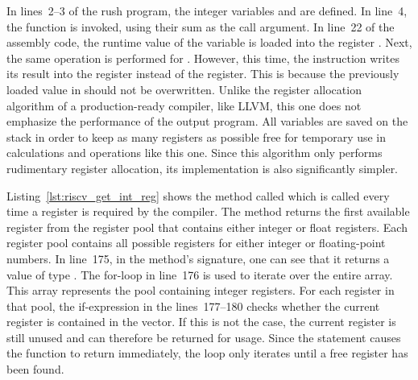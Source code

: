 \noindent
\begin{minipage}{.45\textwidth}
	\centering
\end{minipage}%
\hfill%
\begin{minipage}{.45\textwidth}
	\centering
	\vspace{.1cm}
\end{minipage}

In lines~2--3 of the rush program, the integer variables  and  are defined.
In line~4, the  function is invoked, using their sum as the call argument.
In line~22 of the assembly code, the runtime value of the variable  is loaded into the register .
Next, the same operation is performed for .
However, this time, the instruction writes its result into the  register instead of the  register.
This is because the previously loaded value in  should not be overwritten.
Unlike the register allocation algorithm of a production-ready compiler, like LLVM,
this one does not emphasize the performance of the output program.
All variables are saved on the stack in order to keep as many registers as possible free for temporary use in calculations and operations like this one.
Since this algorithm only performs rudimentary register allocation, its implementation is also significantly simpler.


Listing~\ref{lst:riscv_get_int_reg} shows the method called  which is called every time a register is required by the compiler.
The method returns the first available register from the register pool that contains either integer or float registers.
Each register pool contains all possible registers for either integer or floating-point numbers.
In line~175, in the method's signature, one can see that it returns a value of type .
The for-loop in line~176 is used to iterate over the entire  array.
This array represents the pool containing integer registers.
For each register in that pool, the if-expression in the lines~177--180 checks whether the current register  is contained in the  vector.
If this is not the case, the current register is still unused and can therefore be returned for usage.
Since the  statement causes the function to return immediately,
the loop only iterates until a free register has been found.

